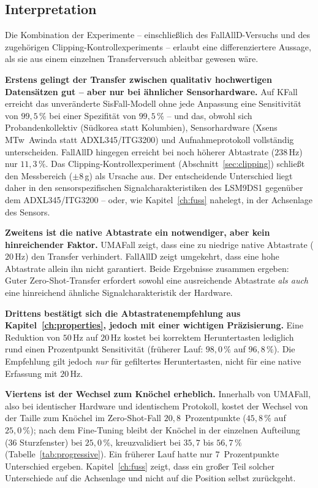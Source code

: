 \documentclass[11pt,a4paper,oneside]{report}
\begin{document}
\subsection{Interpretation}

Die Kombination der Experimente -- einschließlich des FallAllD-Versuchs
und des zugehörigen Clipping-Kontrollexperiments -- erlaubt eine
differenziertere Aussage, als sie aus einem einzelnen Transferversuch
ableitbar gewesen wäre.

\textbf{Erstens gelingt der Transfer zwischen qualitativ hochwertigen
Datensätzen gut -- aber nur bei ähnlicher Sensorhardware.} Auf KFall
erreicht das unveränderte SisFall-Modell ohne jede Anpassung eine
Sensitivität von $99{,}5\,\%$ bei einer Spezifität von $99{,}5\,\%$ --
und das, obwohl sich Probandenkollektiv (Südkorea statt Kolumbien),
Sensorhardware (Xsens MTw~Awinda statt ADXL345/ITG3200) und
Aufnahmeprotokoll vollständig unterscheiden. FallAllD hingegen erreicht
bei noch höherer Abtastrate ($238$\,Hz) nur $11{,}3\,\%$. Das
Clipping-Kontrollexperiment (Abschnitt~\ref{sec:clipping}) schließt
den Messbereich ($\pm 8$\,g) als Ursache aus. Der entscheidende
Unterschied liegt daher in den sensorspezifischen
Signalcharakteristiken des LSM9DS1 gegenüber dem ADXL345/ITG3200 --
oder, wie Kapitel~\ref{ch:fuss} nahelegt, in der Achsenlage des
Sensors.

\textbf{Zweitens ist die native Abtastrate ein notwendiger, aber kein
hinreichender Faktor.} UMAFall zeigt, dass eine zu niedrige native
Abtastrate ($20$\,Hz) den Transfer verhindert. FallAllD zeigt
umgekehrt, dass eine hohe Abtastrate allein ihn nicht garantiert.
Beide Ergebnisse zusammen ergeben: Guter Zero-Shot-Transfer erfordert
sowohl eine ausreichende Abtastrate \emph{als auch} eine hinreichend
ähnliche Signalcharakteristik der Hardware.

\textbf{Drittens bestätigt sich die Abtastratenempfehlung aus
Kapitel~\ref{ch:properties}, jedoch mit einer wichtigen Präzisierung.}
Eine Reduktion von $50$\,Hz auf $20$\,Hz kostet bei korrektem
Heruntertasten lediglich rund einen Prozentpunkt Sensitivität
(früherer Lauf: $98{,}0\,\%$ auf $96{,}8\,\%$). Die Empfehlung gilt jedoch
\emph{nur} für gefiltertes Heruntertasten, nicht für eine native
Erfassung mit $20$\,Hz.

\textbf{Viertens ist der Wechsel zum Knöchel erheblich.} Innerhalb
von UMAFall, also bei identischer Hardware und identischem Protokoll,
kostet der Wechsel von der Taille zum Knöchel im Zero-Shot-Fall
$20{,}8$~Prozentpunkte ($45{,}8\,\%$ auf $25{,}0\,\%$); nach dem
Fine-Tuning bleibt der Knöchel in der einzelnen Aufteilung (36
Sturzfenster) bei $25{,}0\,\%$, kreuzvalidiert bei $35{,}7$ bis
$56{,}7\,\%$ (Tabelle~\ref{tab:progressive}). Ein früherer Lauf hatte
nur $7$~Prozentpunkte Unterschied ergeben. Kapitel~\ref{ch:fuss} zeigt,
dass ein großer Teil solcher Unterschiede auf die Achsenlage und nicht
auf die Position selbst zurückgeht.
\end{document}
